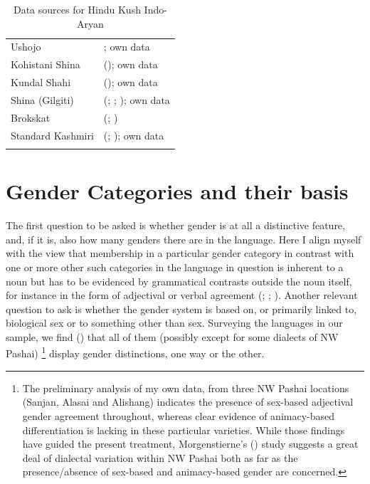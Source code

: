 \documentclass[output=collectionpaper]{langsci/langscibook}
\begin{document}
\begin{table}[p]
\begin{tabularx}{\textwidth}{l>{\raggedright\let\newline\\\arraybackslash\hspace{0pt}}X}
Ushojo & \citep{Decker1992}; own data \\
Kohistani Shina & (\citealt{Schmidt2008}); own data \\
Kundal Shahi & (\citealt{Rehman2005}); own data \\
Shina (Gilgiti) & (\citealt{Bailey1924}; \citealt[13--65]{Degener2008}; \citealt[183--192]{Radloff1998}); own data \\
Brokskat & (\citealt{Ramaswami1982}; \citealt{Sharma1998}) \\
Standard Kashmiri & (\citealt{Koul2003}; \citealt[175--211]{Verbeke2013}); own data \\
\lspbottomrule
\end{tabularx}
\caption{Data sources for Hindu Kush Indo-Aryan}
\label{tab:Lilje:2}
\end{table}


\section{Gender Categories and their basis}
\label{sec:Lilje:4}
The first question to be asked is whether gender is at all a distinctive feature, and, if it is, also how many genders there are in the language. Here I align myself with the view that membership in a particular gender category in contrast with one or more other such categories in the language in question is inherent to a noun but has to be evidenced by grammatical contrasts outside the noun itself, for instance in the form of adjectival or verbal agreement (\citealt[89--90]{Corbett2014}; \citealt[231--233]{Hockett1958}; \citealt[50]{Greenberg1978}). Another relevant question to ask is whether the gender system is based on, or primarily linked to, biological sex or to something other than sex. Surveying the languages in our sample, we find () that all of them (possibly except for some dialects of NW Pashai)%
\footnote{%
The preliminary analysis of my own data, from three NW Pashai locations (Sanjan, Alasai and Alishang) indicates the presence of sex-based adjectival gender agreement throughout, whereas clear evidence of animacy-based differentiation is lacking in these particular varieties. While those findings have guided the present treatment, Morgenstierne's (\citealt*[150--151, 173--176]{Morgenstierne1967}) study suggests a great deal of dialectal variation within NW Pashai both as far as the presence/absence of sex-based and animacy-based gender are concerned.} %
display gender distinctions, one way or the other.
\end{document}
